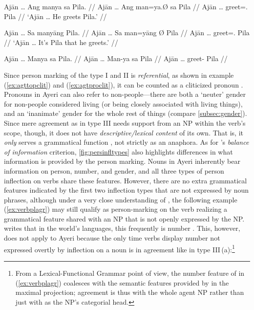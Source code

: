 \pex %
\a\label{ex:agttopclit}\begingl
	\gla Ajān … Ang manya sa Pila. //
	\glb Ajān … Ang man=ya.Ø sa ​Pila //
	\glc Ajān … \AgtT{} greet=\TsgM{}.\Top{} \Parg{} ​Pila //
	\glft `Ajān … He greets Pila.' //
\endgl

\a\label{ex:agtproclit}\begingl
	\gla Ajān … Sa manyāng {} Pila. //
	\glb Ajān … Sa man=yāng Ø Pila //
	\glc Ajān … \PatT{} greet=\TsgM{}.\Aarg{} \Top{} ​Pila //
	\glft `Ajān … It's Pila that he greets.' //
\endgl

\a\label{ex:wrongagr}\ljudge* \begingl
	\gla Ajān … Manya sa Pila. //
	\glb Ajān … Man-ya sa ​Pila //
	\glc Ajān … greet-\TsgM{} \Parg{} ​Pila //
\endgl

\xe

Since person marking of the type I and II is \emph{referential}, as shown in
example (\ref{ex:agttopclit}) and (\ref{ex:agtproclit}), it can be counted as
a cliticized pronoun \citep[103]{corbett2006}. Pronouns in Ayeri can also
refer to non-people---there are both a `neuter' gender for non-people
considered living (or being closely associated with living things), and an
`inanimate' gender for the whole rest of things (compare
\autoref{subsec:gender}). Since mere agreement as in type III needs support
from an NP within the verb's scope, though, it does not have
\emph{descriptive/lexical content} of its own. That is, it \emph{only} serves
a grammatical function \citep[104]{corbett2006}, not strictly as an anaphora.
As for \citet{corbett2006}'s \emph{balance of information} criterion,
\autoref{fig:persinfltypes} also highlights differences in what information is
provided by the person marking. Nouns in Ayeri inherently bear information on
person, number, and gender, and all three types of person inflection on verbs
share these features. However, there are no extra grammatical features
indicated by the first two inflection types that are not expressed by noun
phrases, although under a very close understanding of \citet{corbett2006}, the
following example (\ref{ex:verbplagr}) may still qualify as person-marking on
the verb realizing a grammatical feature shared with an NP that is not openly
expressed by the NP. \citet{corbett2006} writes that in the world's languages, 
this frequently is number \citep[105]{corbett2006}. This, however, does not 
apply to Ayeri because the only time verbs display number not expressed 
overtly by inflection on a noun is in agreement like in type 
III\,(a):\footnote{From a Lexical-Functional Grammar point of view, the number 
feature of  in (\ref{ex:verbplagr}) coalesces with the semantic 
features provided by  in the maximal projection; agreement 
is thus with the whole agent NP rather than just with  as 
the NP's categorial head.}

